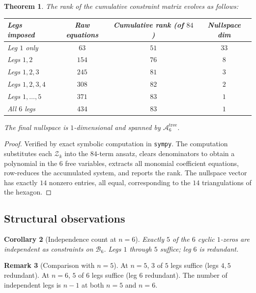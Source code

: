 \documentclass[11pt]{article}
\theoremstyle{plain}
\newtheorem{theorem}{Theorem}[section]
\newtheorem{corollary}[theorem]{Corollary}
\theoremstyle{definition}
\newtheorem{remark}[theorem]{Remark}
\newcommand{\cA}{\mathcal{A}}
\newcommand{\cB}{\mathcal{B}}
\newcommand{\cZ}{\mathcal{Z}}
\begin{document}
\begin{theorem}\label{thm:n6-rank}
The rank of the cumulative constraint matrix evolves as follows:

\begin{center}
\begin{tabular}{lccc}
\toprule
Legs imposed & Raw equations & Cumulative rank (of $84$) & Nullspace dim \\
\midrule
Leg $1$ only      & $63$  & $51$ & $33$ \\
Legs $1, 2$       & $154$ & $76$ & $8$  \\
Legs $1, 2, 3$    & $245$ & $81$ & $3$  \\
Legs $1, 2, 3, 4$ & $308$ & $82$ & $2$  \\
Legs $1, \ldots, 5$ & $371$ & $83$ & $1$ \\
All $6$ legs      & $434$ & $83$ & $1$  \\
\bottomrule
\end{tabular}
\end{center}

The final nullspace is $1$-dimensional and spanned by $\cA_6^{\mathrm{tree}}$.
\end{theorem}

\begin{proof}
Verified by exact symbolic computation in \texttt{sympy}. The computation
substitutes each $\cZ_k$ into the $84$-term ansatz, clears denominators to obtain
a polynomial in the $6$ free variables, extracts all monomial coefficient equations,
row-reduces the accumulated system, and reports the rank. The nullspace vector
has exactly $14$ nonzero entries, all equal, corresponding to the $14$ triangulations
of the hexagon.
\end{proof}

\subsection{Structural observations}

\begin{corollary}[Independence count at $n=6$]
Exactly $5$ of the $6$ cyclic $1$-zeros are independent as constraints on $\cB_6$.
Legs $1$ through $5$ suffice; leg $6$ is redundant.
\end{corollary}

\begin{remark}[Comparison with $n=5$]
At $n=5$, $3$ of $5$ legs suffice (legs $4, 5$ redundant).
At $n=6$, $5$ of $6$ legs suffice (leg $6$ redundant).
The number of independent legs is $n-1$ at both $n=5$ and $n=6$.
\end{remark}
\end{document}

